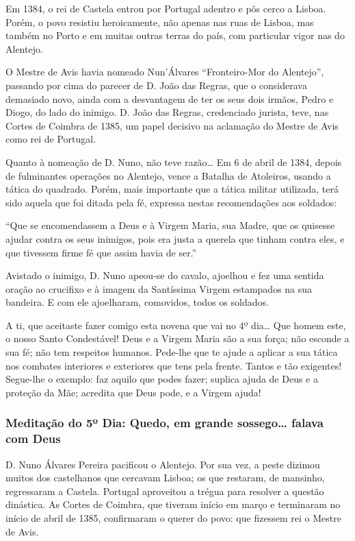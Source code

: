 \documentclass[a4paper,14pt]{extarticle} \usepackage[utf8]{inputenc}
\begin{document}
Em 1384, o rei de Castela entrou por Portugal adentro e pôs cerco a Lisboa. Porém, o povo resistiu heroicamente, não apenas nas ruas de Lisboa, mas também no Porto e em muitas outras terras do país, com particular vigor nas do Alentejo.

O Mestre de Avis havia nomeado Nun’Álvares “Fronteiro-Mor do Alentejo”, passando por cima do parecer de D. João das Regras, que o considerava demasiado novo, ainda com a desvantagem de ter os seus dois irmãos, Pedro e Diogo, do lado do inimigo. D. João das Regras, credenciado jurista, teve, nas Cortes de Coimbra de 1385, um papel decisivo na aclamação do Mestre de Avis como rei de Portugal.

Quanto à nomeação de D. Nuno, não teve razão… Em 6 de abril de 1384, depois de fulminantes operações no Alentejo, vence a Batalha de Atoleiros, usando a tática do quadrado. Porém, mais importante que a tática militar utilizada, terá sido aquela que foi ditada pela fé, expressa nestas recomendações aos soldados:

“Que se encomendassem a Deus e à Virgem Maria, sua Madre, que os quisesse ajudar contra os seus inimigos, pois era justa a querela que tinham contra eles, e que tivessem firme fé que assim havia de ser.”

Avistado o inimigo, D. Nuno apeou-se do cavalo, ajoelhou e fez uma sentida oração ao crucifixo e à imagem da Santíssima Virgem estampados na sua bandeira. E com ele ajoelharam, comovidos, todos os soldados.

A ti, que aceitaste fazer comigo esta novena que vai no 4º dia… Que homem este, o nosso Santo Condestável! Deus e a Virgem Maria são a sua força; não esconde a sua fé; não tem respeitos humanos. Pede-lhe que te ajude a aplicar a sua tática nos combates interiores e exteriores que tens pela frente. Tantos e tão exigentes! Segue-lhe o exemplo: faz aquilo que podes fazer; suplica ajuda de Deus e a proteção da Mãe; acredita que Deus pode, e a Virgem ajuda!


\subsubsection{Meditação do 5º Dia: Quedo, em grande sossego… falava com Deus}

D. Nuno Álvares Pereira pacificou o Alentejo. Por sua vez, a peste dizimou muitos dos castelhanos que cercavam Lisboa; os que restaram, de mansinho, regressaram a Castela. Portugal aproveitou a trégua para resolver a questão dinástica. As Cortes de Coimbra, que tiveram início em março e terminaram no início de abril de 1385, confirmaram o querer do povo: que fizessem rei o Mestre de Avis.
\end{document}
